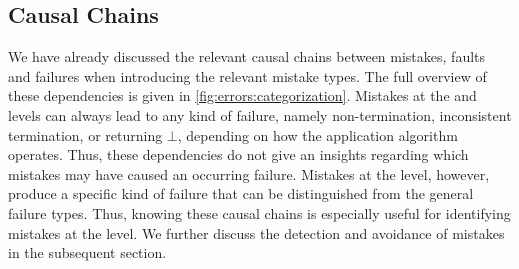 



\subsection{Causal Chains}

We have already discussed the relevant causal chains between mistakes, faults and failures when introducing the relevant mistake types.
The full overview of these dependencies is given in \autoref{fig:errors:categorization}.
Mistakes at the \levelnetworkrelation and \levelnetworkrule levels can always lead to any kind of failure, namely non-termination, inconsistent termination, or returning $\bot$, depending on how the application algorithm operates.
Thus, these dependencies do not give an insights regarding which mistakes may have caused an occurring failure.
Mistakes at the \leveltransformation level, however, produce a specific kind of failure that can be distinguished from the general failure types.
Thus, knowing these causal chains is especially useful for identifying mistakes at the \leveltransformation level.
We further discuss the detection and avoidance of mistakes in the subsequent section.

